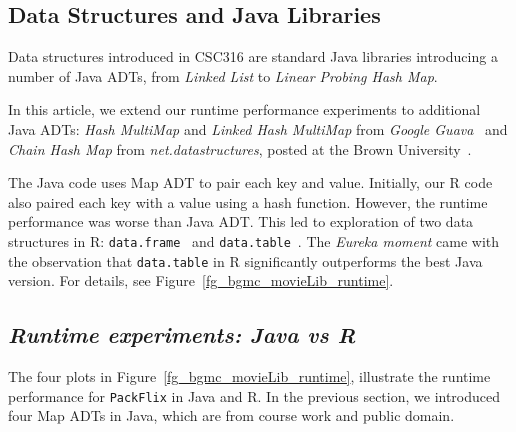 

\subsection{{\sf Data Structures and Java Libraries}}
\noindent
Data structures introduced in CSC316 are standard Java libraries introducing a number of Java ADTs, from {\it Linked List} to {\it Linear Probing Hash Map}.

\par\vspace*{0.9ex}
In this article, we extend our runtime performance experiments to additional Java ADTs:
{\it Hash MultiMap} and {\it Linked Hash MultiMap} from
{\it Google Guava}~\cite{OPUS-csc316-guava} and  {\it Chain Hash Map} from
{\it net.datastructures}, posted at the Brown University~\cite{OPUS-csc316-net-datastructure}.

\par\vspace*{0.9ex}
The Java code uses Map ADT to pair each key and value.
Initially, our R code also paired each key with a value using a hash function. 
However, the runtime performance was worse than Java ADT.
This led to exploration of two data structures in R:
{\tt data.frame}~\cite{OPUS-csc316-data-frame} and 
{\tt data.table}~\cite{OPUS-csc316-data-table}. 
The {\it Eureka moment} came with the observation that  
{\tt data.table} in R significantly
outperforms the best Java version. For details,
see Figure~\ref{fg_bgmc_movieLib_runtime}.
\par\vspace*{0.9ex}

\subsection{{\it \sf Runtime experiments: Java vs R}}
\noindent
%
The four plots in Figure~\ref{fg_bgmc_movieLib_runtime},
illustrate the runtime performance for {\tt PackFlix} in Java and R. 
In the previous section, we introduced four Map ADTs in Java, 
which are from course work and public domain. 

